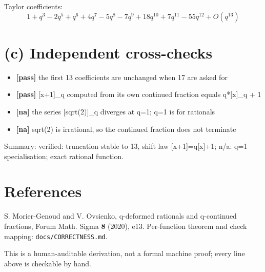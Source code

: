 \documentclass[11pt]{article}
\begin{document}
\noindent Taylor coefficients:
{\small%
\begin{dmath*}
1 + q^{3} - 2 q^{5} + q^{6} + 4 q^{7} - 5 q^{8} - 7 q^{9} + 18 q^{10} + 7 q^{11} - 55 q^{12} + O(q^{13})
\end{dmath*}
}

\section*{(c) Independent cross-checks}
\begin{itemize}
\item \textbf{[pass]} the first 13 coefficients are unchanged when 17 are asked for
\item \textbf{[pass]} [x+1]\_q computed from its own continued fraction equals q*[x]\_q + 1
\item \textbf{[na]} the series [sqrt(2)]\_q diverges at q=1; q=1 is for rationals
\item \textbf{[na]} sqrt(2) is irrational, so the continued fraction does not terminate
\end{itemize}
Summary: verified: truncation stable to 13, shift law [x+1]=q[x]+1; n/a: q=1 specialisation; exact rational function.

\section*{References}
S. Morier-Genoud and V. Ovsienko, q-deformed rationals and q-continued
fractions, Forum Math. Sigma \textbf{8} (2020), e13. Per-function theorem and
check mapping: \texttt{docs/CORRECTNESS.md}.

\medskip
\noindent This is a human-auditable derivation, not a formal machine proof;
every line above is checkable by hand.
\end{document}
